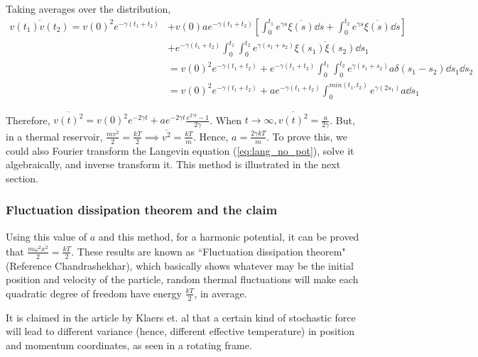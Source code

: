 \documentclass[12pt, twoside]{article}
\begin{document}
Taking averages over the distribution,\\
$\begin{aligned}\overline{v(t_1) v(t_2)} = v(0)^2 e^{-\gamma(t_1 + t_2)} &+ v(0) a e^{-\gamma(t_1 + t_2)} \left[\int_{0}^{t_1} e^{\gamma s} \overline{\xi(s)} \dd{s} + \int_{0}^{t_2} e^{\gamma s} \overline{\xi(s)} \dd{s}\right] \\&+ e^{-\gamma(t_1 + t_2)} \int_{0}^{t_1}\int_{0}^{t_2} e^{\gamma(s_1 + s_2)} \overline{\xi(s_1)\xi(s_2)} \dd{s_1} \\ &= v(0)^2 e^{-\gamma(t_1 + t_2)} + e^{-\gamma(t_1 + t_2)} \int_{0}^{t_1}\int_{0}^{t_2} e^{\gamma(s_1 + s_2)} {a} \delta(s_1 - s_2) \dd{s_1} \dd{s_2} \\ &= v(0)^2 e^{-\gamma(t_1 + t_2)} + a  e^{-\gamma(t_1 + t_2)} \int_{0}^{min(t_1,t_2)} e^{\gamma(2 s_1)} {a} \dd{s_1} \end{aligned}$

Therefore, $\overline{v(t)^2} = v(0)^2 e^{-2\gamma t} + a e^{-2\gamma t}\frac{e^{2\gamma t} - 1}{2\gamma}$. When $t \rightarrow \infty, \overline{v(t)^2} = \frac{a}{2\gamma}$. But, in a thermal reservoir, $\frac{m\overline{v^2}}{2} =\frac{k T}{2} \implies \overline{v^2} = \frac{kT}{m}$. Hence, $a = \frac{2 \gamma k T}{m}$. To prove this, we could also Fourier transform the Langevin equation (\ref{eq:lang_no_pot}), solve it algebraically, and inverse transform it. This method is illustrated in the next section.
\subsubsection{Fluctuation dissipation theorem and the claim}
Using this value of $a$ and this method, for a harmonic potential, it can be proved that $\frac{m \omega^2 \overline{x^2}}{2} = \frac{k T}{2}$. These results are known as ``Fluctuation dissipation theorem" (Reference Chandrashekhar), which basically shows whatever may be the initial position and velocity of the particle, random thermal fluctuations will make each quadratic degree of freedom have energy $\frac{kT}{2}$, in average.

It is claimed in the article by Klaers et. al \cite{klaers} that a certain kind of stochastic force will lead to different variance (hence, different effective temperature) in position and momentum coordinates, as seen in a rotating frame.
\end{document}
